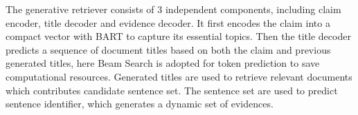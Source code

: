 \documentclass{article}
\begin{document}
The generative retriever consists of 3 independent components, including claim encoder, title decoder and evidence decoder. It first encodes the claim into a compact vector with BART to capture its essential topics. Then the title decoder predicts a sequence of document titles based on both the claim and previous generated titles, here Beam Search is adopted for token prediction to save computational resources. Generated titles are used to retrieve relevant documents which contributes candidate sentence set. The sentence set are used to predict sentence identifier, which generates a dynamic set of evidences.  




\end{document}
